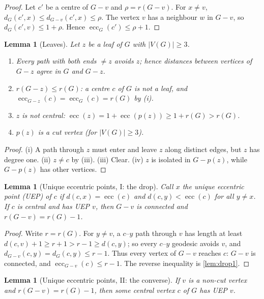 \documentclass[11pt]{article}
\newtheorem{lemma}[theorem]{Lemma}
\theoremstyle{definition}
\newcommand{\ecc}{\operatorname{ecc}}
\begin{document}
\begin{proof}
Let $c'$ be a centre of $G-v$ and $\rho=r(G-v)$.  For $x\ne v$,
$d_G(c',x)\le d_{G-v}(c',x)\le\rho$.  The vertex $v$ has a neighbour $w$ in
$G-v$, so $d_G(c',v)\le1+\rho$.  Hence $\ecc_G(c')\le\rho+1$.
\end{proof}

\begin{lemma}[Leaves]\label{lem:leafbasics}
Let $z$ be a leaf of $G$ with $|V(G)|\ge3$.
\begin{enumerate}[label=(\roman*)]
\item Every path with both ends $\ne z$ avoids $z$; hence distances between
      vertices of $G-z$ agree in $G$ and $G-z$.
\item $r(G-z)\le r(G)$: a centre $c$ of $G$ is not a leaf, and
      $\ecc_{G-z}(c)=\ecc_G(c)=r(G)$ by (i).
\item $z$ is not central: $\ecc(z)=1+\ecc(p(z))\ge 1+r(G)>r(G)$.
\item $p(z)$ is a cut vertex (for $|V(G)|\ge3$).
\end{enumerate}
\end{lemma}

\begin{proof}
(i) A path through $z$ must enter and leave $z$ along distinct edges, but $z$
has degree one.  (ii) $z\ne c$ by (iii).  (iii) Clear.  (iv) $z$ is isolated
in $G-p(z)$, while $G-p(z)$ has other vertices.
\end{proof}

\begin{lemma}[Unique eccentric points, I: the drop]\label{lem:uepdrop}
Call $x$ the \emph{unique eccentric point} (\emph{UEP}) of $c$ if
$d(c,x)=\ecc(c)$ and $d(c,y)<\ecc(c)$ for all $y\ne x$.  If $c$ is central
and has UEP $v$, then $G-v$ is connected and $r(G-v)=r(G)-1$.
\end{lemma}

\begin{proof}
Write $r=r(G)$.  For $y\ne v$, a $c$--$y$ path through $v$ has length at
least $d(c,v)+1\ge r+1>r-1\ge d(c,y)$; so every $c$--$y$ geodesic avoids $v$,
and $d_{G-v}(c,y)=d_G(c,y)\le r-1$.  Thus every vertex of $G-v$ reaches $c$:
$G-v$ is connected, and $\ecc_{G-v}(c)\le r-1$.  The reverse inequality is
\cref{lem:drop1}.
\end{proof}

\begin{lemma}[Unique eccentric points, II: the converse]\label{lem:dropuep}
If $v$ is a non-cut vertex and $r(G-v)=r(G)-1$, then some central vertex $c$
of $G$ has UEP $v$.
\end{lemma}
\end{document}
